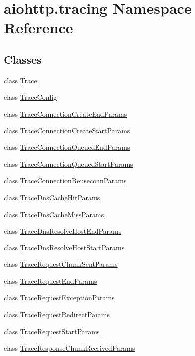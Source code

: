\hypertarget{namespaceaiohttp_1_1tracing}{}\section{aiohttp.\+tracing Namespace Reference}
\label{namespaceaiohttp_1_1tracing}
\subsection*{Classes}
\begin{DoxyCompactItemize}
\item 
class \hyperlink{classaiohttp_1_1tracing_1_1_trace}{Trace}
\item 
class \hyperlink{classaiohttp_1_1tracing_1_1_trace_config}{Trace\+Config}
\item 
class \hyperlink{classaiohttp_1_1tracing_1_1_trace_connection_create_end_params}{Trace\+Connection\+Create\+End\+Params}
\item 
class \hyperlink{classaiohttp_1_1tracing_1_1_trace_connection_create_start_params}{Trace\+Connection\+Create\+Start\+Params}
\item 
class \hyperlink{classaiohttp_1_1tracing_1_1_trace_connection_queued_end_params}{Trace\+Connection\+Queued\+End\+Params}
\item 
class \hyperlink{classaiohttp_1_1tracing_1_1_trace_connection_queued_start_params}{Trace\+Connection\+Queued\+Start\+Params}
\item 
class \hyperlink{classaiohttp_1_1tracing_1_1_trace_connection_reuseconn_params}{Trace\+Connection\+Reuseconn\+Params}
\item 
class \hyperlink{classaiohttp_1_1tracing_1_1_trace_dns_cache_hit_params}{Trace\+Dns\+Cache\+Hit\+Params}
\item 
class \hyperlink{classaiohttp_1_1tracing_1_1_trace_dns_cache_miss_params}{Trace\+Dns\+Cache\+Miss\+Params}
\item 
class \hyperlink{classaiohttp_1_1tracing_1_1_trace_dns_resolve_host_end_params}{Trace\+Dns\+Resolve\+Host\+End\+Params}
\item 
class \hyperlink{classaiohttp_1_1tracing_1_1_trace_dns_resolve_host_start_params}{Trace\+Dns\+Resolve\+Host\+Start\+Params}
\item 
class \hyperlink{classaiohttp_1_1tracing_1_1_trace_request_chunk_sent_params}{Trace\+Request\+Chunk\+Sent\+Params}
\item 
class \hyperlink{classaiohttp_1_1tracing_1_1_trace_request_end_params}{Trace\+Request\+End\+Params}
\item 
class \hyperlink{classaiohttp_1_1tracing_1_1_trace_request_exception_params}{Trace\+Request\+Exception\+Params}
\item 
class \hyperlink{classaiohttp_1_1tracing_1_1_trace_request_redirect_params}{Trace\+Request\+Redirect\+Params}
\item 
class \hyperlink{classaiohttp_1_1tracing_1_1_trace_request_start_params}{Trace\+Request\+Start\+Params}
\item 
class \hyperlink{classaiohttp_1_1tracing_1_1_trace_response_chunk_received_params}{Trace\+Response\+Chunk\+Received\+Params}
\end{DoxyCompactItemize}
